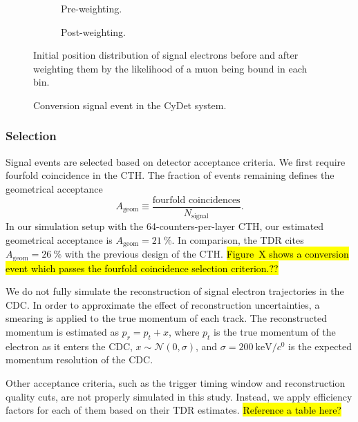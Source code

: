 
\begin{figure}
    \centering
    \begin{subfigure}{0.46\textwidth}
        \centering
        \caption{Pre-weighting.}
    \end{subfigure}
    \hfill
    \begin{subfigure}{0.46\textwidth}
        \centering
        \caption{Post-weighting.}
    \end{subfigure}
    \caption{ Initial position distribution of signal electrons before and after
        weighting them by the likelihood of a muon being bound in each bin. }
    \label{fig:stopping_position_reweighting}
\end{figure}

\begin{figure}
    \centering
    
    \caption{Conversion signal event in the CyDet system.}
    \label{fig:signal_in_cydet}
\end{figure}

\subsubsection{Selection}
Signal events are selected based on detector acceptance criteria. We first require
fourfold coincidence in the CTH. The fraction of events remaining
defines the geometrical acceptance 
$$
A_\mathrm{geom} \equiv  \frac{\text{fourfold coincidences}}{N_\mathrm{signal}}.
$$
In our simulation setup with the 64-counters-per-layer CTH, our estimated
geometrical acceptance is $A_\mathrm{geom} = \SI{21}{\percent}$. In comparison,
the TDR cites $A_\mathrm{geom} = \SI{26}{\percent}$ with the previous design of
the CTH. 
\hl{Figure~X shows a conversion event which passes the
fourfold coincidence selection criterion.??}

We do not fully simulate the reconstruction of signal electron trajectories in
the CDC. In order to approximate the effect of reconstruction uncertainties, a
smearing is applied to the true momentum of each track. The reconstructed
momentum is estimated as $p_r = p_t + x$, where $p_t$ is the true momentum of
the electron as it enters the CDC, $x \sim \mathcal{N}(0, \sigma)$, and $\sigma
= \SI{200}{\keV/\clight}$ is the expected momentum resolution of the CDC.

Other acceptance criteria, such as the trigger timing window and reconstruction
quality cuts, are not properly simulated in this study. Instead, we apply
efficiency factors for each of them based on their TDR estimates.
\hl{Reference a table here?}


